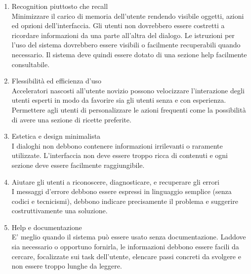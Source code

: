 \begin{enumerate}
\item Recognition piuttosto che recall\\
Minimizzare il carico di memoria dell’utente rendendo visibile oggetti,
azioni ed opzioni dell’interfaccia. Gli utenti non dovrebbero essere costretti a ricordare informazioni da una parte all’altra del dialogo. Le istruzioni per l’uso del sistema dovrebbero essere visibili o facilmente recuperabili quando necessario. Il sistema deve quindi essere dotato di una sezione help facilmente consultabile.\\

\item Flessibilità ed efficienza d’uso\\
Acceleratori nascosti all’utente novizio possono velocizzare l’interazione
degli utenti esperti in modo da favorire sia gli utenti senza e con esperienza.
Permettere agli utenti di personalizzare le azioni frequenti come la possibilità di avere una sezione di ricette preferite.\\

\item Estetica e design minimalista\\
I dialoghi non debbono contenere informazioni irrilevanti o raramente utilizzate. L'interfaccia non deve essere troppo ricca di contenuti e ogni sezione deve essere facilmente raggiungibile.\\

\item Aiutare gli utenti a riconoscere, diagnosticare, e recuperare gli errori\\
I messaggi d’errore debbono essere espressi in linguaggio semplice (senza codici e tecnicismi), debbono indicare precisamente il problema e suggerire costruttivamente una soluzione.\\

\item Help e documentazione\\
E' meglio quando il sistema può essere usato senza documentazione. Laddove sia necessario o opportuno fornirla, le informazioni debbono essere facili da cercare, focalizzate sui task dell'utente, elencare passi concreti da svolgere e non essere troppo lunghe da leggere. 
\end{enumerate}

